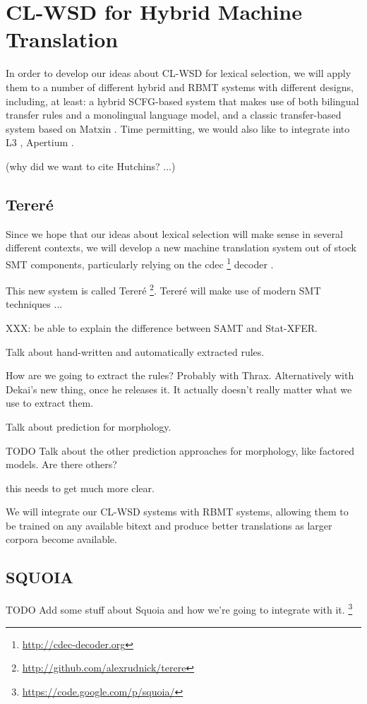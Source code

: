 \section{CL-WSD for Hybrid Machine Translation}
In order to develop our ideas about CL-WSD for lexical selection, we will apply
them to a number of different hybrid and RBMT systems with different designs,
including, at least: a hybrid SCFG-based system that makes use of both
bilingual transfer rules and a monolingual language model, and a classic
transfer-based system based on Matxin \cite{matxin_2005}. Time permitting, we
would also like to integrate into L3 \cite{gasser:sxdg}, Apertium
\cite{Forcada_theapertium}.

(why did we want to cite Hutchins? ...)
\cite{hutchins1992introduction}

\subsection{Tereré}
Since we hope that our ideas about lexical selection will make sense in several
different contexts, we will develop a new machine translation system out of
stock SMT components, particularly relying on the cdec
\footnote{\url{http://cdec-decoder.org}} decoder \cite{Dyer_etal_2010}.

This new system is called
Tereré \footnote{\url{http://github.com/alexrudnick/terere}}. Tereré will make
use of modern SMT techniques ...

XXX: be able to explain the difference between SAMT and Stat-XFER.

Talk about hand-written and automatically extracted rules.

How are we going to extract the rules? Probably with Thrax. Alternatively with
Dekai's new thing, once he releases it. It actually doesn't really matter what
we use to extract them.

Talk about prediction for morphology.
\cite{toutanova-suzuki-ruopp:2008:ACLMain}

TODO Talk about the other prediction approaches for morphology, like factored
models. Are there others?

this needs to get much more clear.

We will integrate our CL-WSD systems with RBMT systems, allowing them to be
trained on any available bitext and produce better translations as larger
corpora become available.

\subsection{SQUOIA}
TODO Add some stuff about Squoia and how we're going to integrate with it.
\cite{riosgonzales-gohring:2013:HyTra}
\footnote{\url{https://code.google.com/p/squoia/}}


